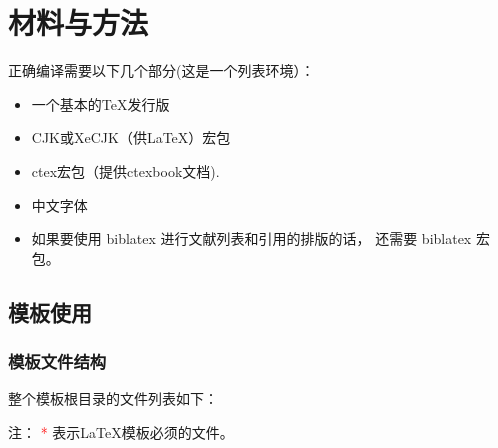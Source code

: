 \chapter{材料与方法}

正确编译需要以下几个部分(这是一个列表环境）：
\begin{itemize}
    \item 一个基本的\TeX{}发行版
    \item CJK或XeCJK（供\LaTeX{}）宏包
    \item ctex宏包（提供ctexbook文档).
    \item 中文字体
    \item 如果要使用 biblatex 进行文献列表和引用的排版的话， 还需要 biblatex 宏包。
\end{itemize}

\section{模板使用}
\subsection{模板文件结构\label{sec:files}}
整个模板根目录的文件列表如下：
\begin{center}
    \begin{table}
    \end{table}
\end{center}
注： \textcolor{red}{{*}} 表示\LaTeX{}模板必须的文件。
